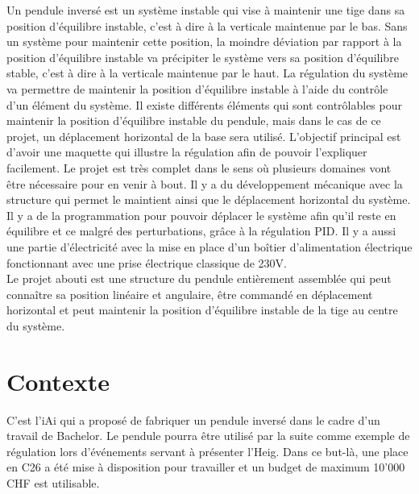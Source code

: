Un pendule inversé est un système instable qui vise à maintenir une tige dans sa position d'équilibre instable, c'est à dire à la verticale
maintenue par le bas. Sans un système pour maintenir cette position, la moindre déviation par rapport à la position d'équilibre instable va
précipiter le système vers sa position d'équilibre stable, c'est à dire à la verticale maintenue par le haut. La régulation du système va
permettre de maintenir la position d'équilibre instable à l'aide du contrôle d'un élément du système. Il existe différents éléments qui sont
contrôlables pour maintenir la position d'équilibre instable du pendule, mais dans le cas de ce projet, un déplacement horizontal de la base
sera utilisé. L'objectif principal est d'avoir une maquette qui illustre la régulation afin de pouvoir l'expliquer facilement. Le projet est
très complet dans le sens où plusieurs domaines vont être nécessaire pour en venir à bout. Il y a du développement mécanique avec la structure
qui permet le maintient ainsi que le déplacement horizontal du système. Il y a de la programmation pour pouvoir déplacer le système afin qu'il
reste en équilibre et ce malgré des perturbations, grâce à la régulation \gls{PID}. Il y a aussi une partie d'électricité avec la mise en place
d'un boîtier d'alimentation électrique fonctionnant avec une prise électrique classique de 230V.\\

Le projet abouti est une structure du pendule entièrement assemblée qui peut connaître sa position linéaire et angulaire, être commandé
en déplacement horizontal et peut maintenir la position d'équilibre instable de la tige au centre du système.

\section{Contexte}
C'est l'\acrlong{iAi} qui a proposé de fabriquer un pendule inversé dans le cadre d'un travail
de Bachelor. Le pendule pourra être utilisé par la suite comme exemple de régulation lors d'événements servant à présenter l'\acrshort{Heig}.
Dans ce but-là, une place en C26 a été mise à disposition pour travailler et un budget de maximum 10'000 CHF est utilisable.